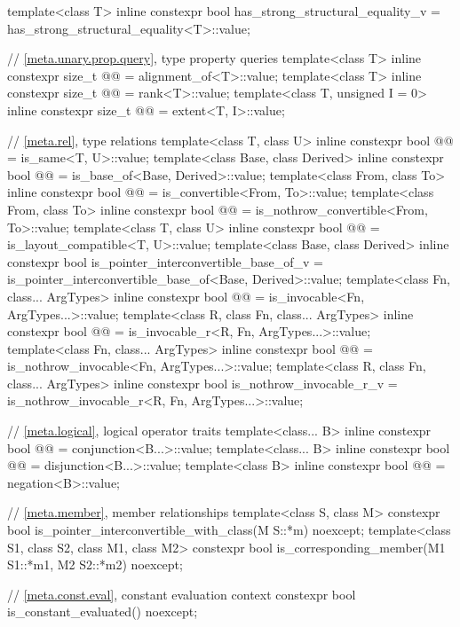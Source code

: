\begin{codeblock}
{  template<class T>
    inline constexpr bool has_strong_structural_equality_v
      =  has_strong_structural_equality<T>::value;

  // \ref{meta.unary.prop.query}, type property queries
  template<class T>
    inline constexpr size_t @@ = alignment_of<T>::value;
  template<class T>
    inline constexpr size_t @@ = rank<T>::value;
  template<class T, unsigned I = 0>
    inline constexpr size_t @@ = extent<T, I>::value;

  // \ref{meta.rel}, type relations
  template<class T, class U>
    inline constexpr bool @@ = is_same<T, U>::value;
  template<class Base, class Derived>
    inline constexpr bool @@ = is_base_of<Base, Derived>::value;
  template<class From, class To>
    inline constexpr bool @@ = is_convertible<From, To>::value;
  template<class From, class To>
    inline constexpr bool @@ = is_nothrow_convertible<From, To>::value;
  template<class T, class U>
    inline constexpr bool @@ = is_layout_compatible<T, U>::value;
  template<class Base, class Derived>
    inline constexpr bool is_pointer_interconvertible_base_of_v
      = is_pointer_interconvertible_base_of<Base, Derived>::value;
  template<class Fn, class... ArgTypes>
    inline constexpr bool @@ = is_invocable<Fn, ArgTypes...>::value;
  template<class R, class Fn, class... ArgTypes>
    inline constexpr bool @@ = is_invocable_r<R, Fn, ArgTypes...>::value;
  template<class Fn, class... ArgTypes>
    inline constexpr bool @@ = is_nothrow_invocable<Fn, ArgTypes...>::value;
  template<class R, class Fn, class... ArgTypes>
    inline constexpr bool is_nothrow_invocable_r_v
      = is_nothrow_invocable_r<R, Fn, ArgTypes...>::value;

  // \ref{meta.logical}, logical operator traits
  template<class... B>
    inline constexpr bool @@ = conjunction<B...>::value;
  template<class... B>
    inline constexpr bool @@ = disjunction<B...>::value;
  template<class B>
    inline constexpr bool @@ = negation<B>::value;

  // \ref{meta.member}, member relationships
  template<class S, class M>
    constexpr bool is_pointer_interconvertible_with_class(M S::*m) noexcept;
  template<class S1, class S2, class M1, class M2>
    constexpr bool is_corresponding_member(M1 S1::*m1, M2 S2::*m2) noexcept;

  // \ref{meta.const.eval}, constant evaluation context
  constexpr bool is_constant_evaluated() noexcept;
}
\end{codeblock}

